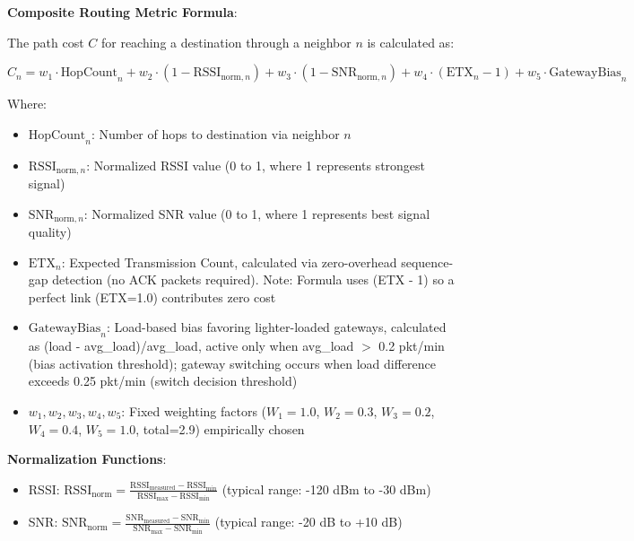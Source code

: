 \textbf{Composite Routing Metric Formula}:

The path cost $C$ for reaching a destination through a neighbor $n$ is calculated as:

\begin{equation}
C_n = w_1 \cdot \text{HopCount}_n + w_2 \cdot (1 - \text{RSSI}_{\text{norm},n}) + w_3 \cdot (1 - \text{SNR}_{\text{norm},n}) + w_4 \cdot (\text{ETX}_n - 1) + w_5 \cdot \text{GatewayBias}_n
\label{eq:composite-cost}
\end{equation}

Where:
\begin{itemize}
\item $\text{HopCount}_n$: Number of hops to destination via neighbor $n$
\item $\text{RSSI}_{\text{norm},n}$: Normalized RSSI value (0 to 1, where 1 represents strongest signal)
\item $\text{SNR}_{\text{norm},n}$: Normalized SNR value (0 to 1, where 1 represents best signal quality)
\item $\text{ETX}_n$: Expected Transmission Count, calculated via zero-overhead sequence-gap detection (no ACK packets required). Note: Formula uses (ETX - 1) so a perfect link (ETX=1.0) contributes zero cost
\item $\text{GatewayBias}_n$: Load-based bias favoring lighter-loaded gateways, calculated as (load - avg\_load)/avg\_load, active only when avg\_load $>$ 0.2 pkt/min (bias activation threshold); gateway switching occurs when load difference exceeds 0.25 pkt/min (switch decision threshold)
\item $w_1, w_2, w_3, w_4, w_5$: Fixed weighting factors ($W_1=1.0$, $W_2=0.3$, $W_3=0.2$, $W_4=0.4$, $W_5=1.0$, total=2.9) empirically chosen
\end{itemize}

\textbf{Normalization Functions}:

\begin{itemize}
\item RSSI: $\text{RSSI}_{\text{norm}} = \frac{\text{RSSI}_{\text{measured}} - \text{RSSI}_{\text{min}}}{\text{RSSI}_{\text{max}} - \text{RSSI}_{\text{min}}}$ (typical range: -120 dBm to -30 dBm)

\item SNR: $\text{SNR}_{\text{norm}} = \frac{\text{SNR}_{\text{measured}} - \text{SNR}_{\text{min}}}{\text{SNR}_{\text{max}} - \text{SNR}_{\text{min}}}$ (typical range: -20 dB to +10 dB)
\end{itemize}

